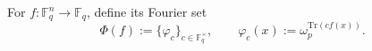 \begin{definition}
\label{def:ff-fourier-set}
\leanok
For $f : \mathbb{F}_q^n \to \mathbb{F}_q$, define its Fourier set
  \[
    \Phi(f) := \{\varphi_c\}_{c \in \mathbb{F}_q^\times},
    \qquad
    \varphi_c(x) := \omega_p^{\mathrm{Tr}(c f(x))}.
  \]
\end{definition}
